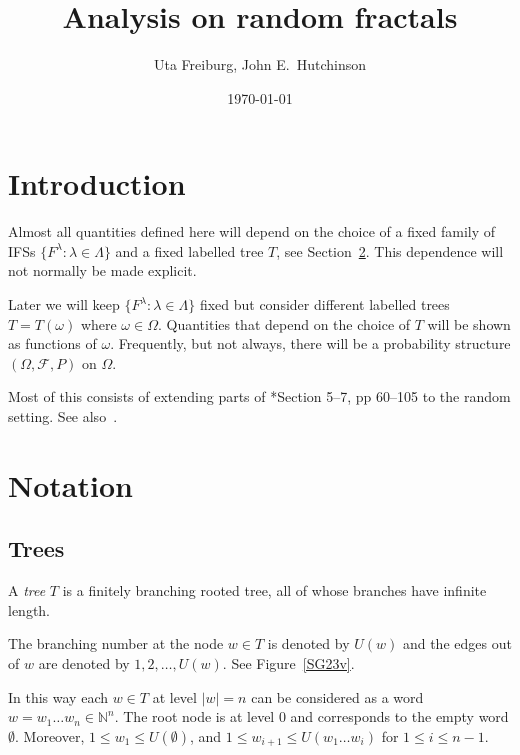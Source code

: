 \documentclass[a4paper]{amsart}
\theoremstyle{plain}
\theoremstyle{definition}
\theoremstyle{remark}
\begin{document}
\title{Analysis on random fractals}  
\author{Uta Freiburg, John E.\ Hutchinson}
\date{\today}

\maketitle




\tableofcontents

 \section{\textbf{Introduction}}

 Almost all quantities defined here will depend on the choice of a  fixed  family of IFSs $  \{ F^\lambda : \lambda \in \Lambda \}  $ and a  fixed  labelled tree $ T $, see Section~\ref{secnot}.  This dependence will not normally be made explicit.

Later we will keep $  \{ F^\lambda : \lambda \in \Lambda \}  $  fixed  but consider  different  labelled trees $ T = T(\omega) $ where $ \omega \in \Omega $.   Quantities that depend on the choice of $ T $ will be shown as functions of $ \omega $.  Frequently, but not always, there will be a probability structure $ (\Omega, \mathcal{F}, P) $ on $ \Omega $.  

\medskip Most of this consists of extending parts of \cite{Bar}*{Section 5--7, pp 60--105} to the random setting.   See also~\cite{Ham}. 

 

\section{\textbf{Notation}}\label{secnot}

\subsection{Trees} A \emph{tree} $ T $  is a finitely branching rooted tree, all of whose branches have infinite length.

The branching number at the node $ w \in T $ is denoted by $ U(w) $ and the edges out of $ w $ are denoted by $ 1,2,\dots, U(w) $.  See Figure~\ref{SG23v}.

In this way each $ w \in T $ at level $ |w| =n $ can be considered  as a word $ w = w_1\dots w_n \in \mathbb{N} ^n$. 
The root node is at level $ 0 $ and corresponds to the empty word $ \emptyset $. Moreover, $ 1 \leq w_1 \leq U(\emptyset  )$,  and $ 1 \leq w_{i+1} \leq U(  w_1\dots w_i )$ for $ 1 \leq i \leq n-1 $. 
\end{document}
